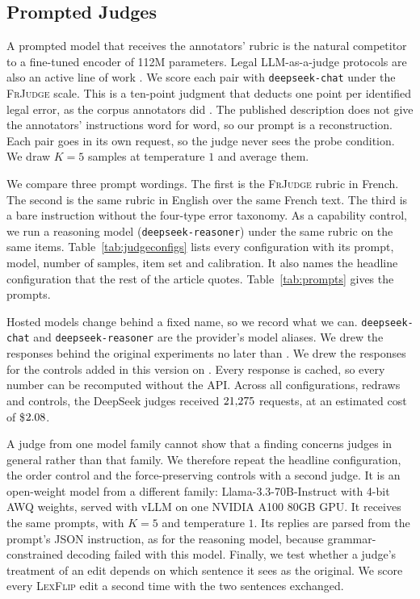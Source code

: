 \documentclass{BVP_JCLLT}
\newcommand{\rev}[1]{#1}
\newcommand{\rev}[1]{{\color{revcol}#1}}
\begin{document}
\subsection{Prompted Judges}\label{sec:judgemethod}

\rev{A prompted model that receives the annotators' rubric is the natural
competitor to a fine-tuned encoder of 112M parameters. Legal LLM-as-a-judge
protocols are also an active line of work \cite{enguehard2025lemaj}. We score
each pair with \texttt{deepseek-chat} under the \textsc{FrJudge} scale. This is a
ten-point judgment that deducts one point per identified legal error, as the
corpus annotators did \cite{beauchemin2025judgebert}. The published description
does not give the annotators' instructions word for word, so our prompt is a
reconstruction. Each pair goes in its own request, so the judge never sees the
probe condition. We draw $K=5$ samples at temperature $1$ and average them.

We compare three prompt wordings. The first is the \textsc{FrJudge} rubric in
French. The second is the same rubric in English over the same French text. The
third is a bare instruction without the four-type error taxonomy. As a capability control, we run a reasoning model
(\texttt{deepseek-reasoner}) under the same rubric on the same items.
Table~\ref{tab:judgeconfigs} lists every configuration with its prompt, model,
number of samples, item set and calibration. It also names the headline
configuration that the rest of the article quotes. Table~\ref{tab:prompts} gives
the prompts.

Hosted models change behind a fixed name, so we record what we can.
\texttt{deepseek-chat} and \texttt{deepseek-reasoner} are the provider's model
aliases. We drew the responses behind the original experiments no later
than \judgeDateFirst. We drew the responses for the controls added in this
version on \judgeDateRev. Every response is cached, so every number can be recomputed
without the API. Across all configurations, redraws and controls, the DeepSeek
judges received $21{,}275$ requests, at an estimated cost of
\$$2.08$.

A judge from one model family cannot show that a finding concerns judges in
general rather than that family. We therefore repeat the headline configuration,
the order control and the force-preserving controls with a second judge. It is
an open-weight model from a different family: Llama-3.3-70B-Instruct with 4-bit
AWQ weights, served with vLLM on one NVIDIA A100 80GB GPU. It receives the same prompts, with $K=5$
and temperature $1$. Its replies are parsed from the prompt's JSON instruction,
as for the reasoning model, because grammar-constrained decoding failed with
this model. Finally, we test whether a judge's treatment of an edit depends on
which sentence it sees as the original. We score every \textsc{LexFlip} edit a
second time with the two sentences exchanged.}
\end{document}
